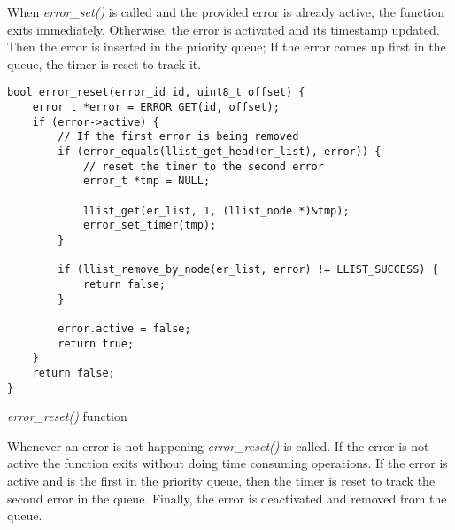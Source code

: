 When \textit{error\_set()} is called and the provided error is already active, the function exits immediately. Otherwise, the error is activated and its timestamp updated. Then the error is inserted in the priority queue; If the error comes up first in the queue, the timer is reset to track it.
\begin{listing}[h]
	\begin{verbatim}
bool error_reset(error_id id, uint8_t offset) {
	error_t *error = ERROR_GET(id, offset);
	if (error->active) {
		// If the first error is being removed
		if (error_equals(llist_get_head(er_list), error)) {
			// reset the timer to the second error
			error_t *tmp = NULL;
		
			llist_get(er_list, 1, (llist_node *)&tmp);
			error_set_timer(tmp);
		}
		
		if (llist_remove_by_node(er_list, error) != LLIST_SUCCESS) {
			return false;
		}
		
		error.active = false;
		return true;
	}
	return false;
}
	\end{verbatim}
	\caption{\textit{error\_reset()} function}
	\label{code:error_reset}
\end{listing}

Whenever an error is not happening \textit{error\_reset()} is called. If the error is not active the function exits without doing time consuming operations. If the error is active and is the first in the priority queue, then the timer is reset to track the second error in the queue. Finally, the error is deactivated and removed from the queue.

